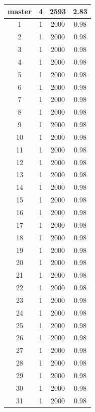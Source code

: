 \documentclass[12pt, letterpaper]{article}
\begin{document}
\begin{center}
\begin{longtable} {| c | c | c | c |}
		master & 4 & 2593 & 2.83 \\ \hline
		1	   & 1 & 2000 & 0.98 \\ \hline
		2	   & 1 & 2000 & 0.98 \\ \hline
		3	   & 1 & 2000 & 0.98 \\ \hline
		4	   & 1 & 2000 & 0.98 \\ \hline
		5	   & 1 & 2000 & 0.98 \\ \hline
		6	   & 1 & 2000 & 0.98 \\ \hline
		7	   & 1 & 2000 & 0.98 \\ \hline
		8	   & 1 & 2000 & 0.98 \\ \hline
		9	   & 1 & 2000 & 0.98 \\ \hline
		10	   & 1 & 2000 & 0.98 \\ \hline
		11	   & 1 & 2000 & 0.98 \\ \hline
		12	   & 1 & 2000 & 0.98 \\ \hline
		13	   & 1 & 2000 & 0.98 \\ \hline
		14	   & 1 & 2000 & 0.98 \\ \hline
		15	   & 1 & 2000 & 0.98 \\ \hline
		16	   & 1 & 2000 & 0.98 \\ \hline
		17	   & 1 & 2000 & 0.98 \\ \hline
		18	   & 1 & 2000 & 0.98 \\ \hline
		19	   & 1 & 2000 & 0.98 \\ \hline
		20	   & 1 & 2000 & 0.98 \\ \hline
		21	   & 1 & 2000 & 0.98 \\ \hline
		22	   & 1 & 2000 & 0.98 \\ \hline
		23	   & 1 & 2000 & 0.98 \\ \hline
		24	   & 1 & 2000 & 0.98 \\ \hline
		25	   & 1 & 2000 & 0.98 \\ \hline
		26	   & 1 & 2000 & 0.98 \\ \hline
		27	   & 1 & 2000 & 0.98 \\ \hline
		28	   & 1 & 2000 & 0.98 \\ \hline
		29	   & 1 & 2000 & 0.98 \\ \hline
		30	   & 1 & 2000 & 0.98 \\ \hline
		31	   & 1 & 2000 & 0.98 \\ \hline
		
	\end{longtable}
	\label{tbl:table01}
\end{center}
\end{document}
